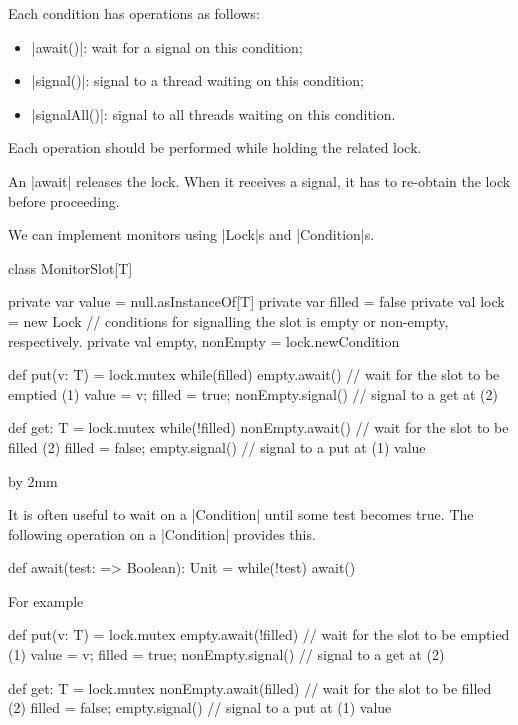 \begin{slide}

Each condition has operations as follows:
%
\begin{itemize}
\item |await()|: wait for a signal on this condition;
\item |signal()|: signal to a thread waiting on this condition;
\item |signalAll()|: signal to all threads waiting on this condition.
\end{itemize}
%
Each operation should be performed while holding the related lock. 

An |await| releases the lock.  When it receives a signal, it has to re-obtain
the lock before proceeding.

We can implement monitors using |Lock|s and |Condition|s. 
\end{slide}


\begin{slide}

\begin{scala}
class MonitorSlot[T]{
  private var value = null.asInstanceOf[T]
  private var filled = false
  private val lock = new Lock
  // conditions for signalling the slot is empty or non-empty, respectively.
  private val empty, nonEmpty = lock.newCondition

  def put(v: T) = lock.mutex{
    while(filled) empty.await()           // wait for the slot to be emptied (1)
    value = v; filled = true; nonEmpty.signal() // signal to a get at (2)
  }

  def get: T = lock.mutex{
    while(!filled) nonEmpty.await()     // wait for the slot to be filled (2)
    filled = false; empty.signal()        // signal to a put at (1)
    value
} }
\end{scala}
\end{slide}

{\advance \slideheight by 2mm
\begin{slide}

It is often useful to wait on a |Condition| until some test becomes true.  The
following operation on a |Condition| provides this.
\begin{scala}
  def await(test: => Boolean): Unit = while(!test) await()
\end{scala}

For example
%
\begin{scala}
  def put(v: T) = lock.mutex{
    empty.await(!filled)                  // wait for the slot to be emptied (1)
    value = v; filled = true; nonEmpty.signal() // signal to a get at (2)
  }

  def get: T = lock.mutex{
    nonEmpty.await(filled)               // wait for the slot to be filled (2)
    filled = false; empty.signal()       // signal to a put at (1)
    value
  }
\end{scala}
\end{slide}}

